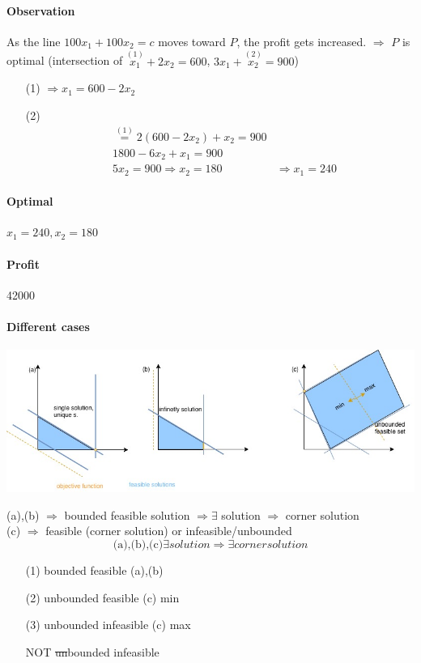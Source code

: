 \paragraph{Observation} As the line $100x_1+100x_2=c$ moves toward $P$, the profit gets increased. $\Rightarrow$ $P$ is optimal (intersection of $\stackrel{(1)}{x_1}+2x_2=600$, $3x_1+\stackrel{(2)}{x_2} = 900$) \\
\begin{itemize}
	\item[(1)] $\Rightarrow x_1 = 600 - 2x_2$
	\item[(2)] \begin{align*} &\stackrel{(1)}{=}2(600-2x_2)+x_2 = 900 \\
	& 1800 - 6x_2+x_1 = 900 \\
	&5x_2 = 900 \Rightarrow x_2 = 180
	& \Rightarrow x_1 = 240
	\end{align*}
\end{itemize}
\paragraph{Optimal} $x_1 = 240, x_2 = 180$
\paragraph{Profit} 42000 \EUR
\paragraph{Different cases}
\begin{center}
	\includegraphics[scale=0.5]{img/dia3}
\end{center}
(a),(b) $\Rightarrow$ bounded feasible solution $\Rightarrow \exists$ solution $\Rightarrow$ corner solution \\
(c) $\Rightarrow$ feasible (corner solution) or infeasible/unbounded
$$\text{(a),(b),(c)} \exists solution \Rightarrow \exists corner solution$$
\begin{itemize}
	\item[(1)] bounded feasible (a),(b)
	\item[(2)] unbounded feasible (c) min
	\item[(3)] unbounded infeasible (c) max
	\item[NOT] \sout{un}bounded infeasible
\end{itemize}
